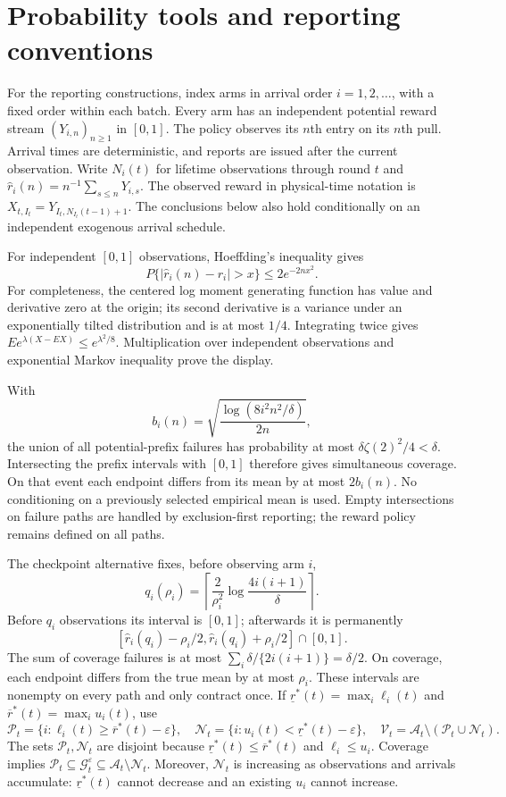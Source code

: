 \section{Probability tools and reporting conventions}
\label{app:tools}

For the reporting constructions, index arms in arrival order
$i=1,2,\ldots$, with a fixed order within each batch.
Every arm has an independent potential reward stream $(Y_{i,n})_{n\ge1}$
in $[0,1]$. The policy observes its $n$th entry on its $n$th pull. Arrival
times are deterministic, and reports are issued after the current observation.
Write $N_i(t)$ for lifetime observations through round $t$ and
$\hat r_i(n)=n^{-1}\sum_{s\le n}Y_{i,s}$. The observed reward in physical-time notation is
$X_{t,I_t}=Y_{I_t,N_{I_t}(t-1)+1}$. The conclusions below also
hold conditionally on an independent exogenous arrival schedule.

For independent $[0,1]$ observations, Hoeffding's inequality gives
\[
 P\{|\hat r_i(n)-r_i|>x\}\le2e^{-2nx^2}.
\]
For completeness, the centered log moment generating function has value and
derivative zero at the origin; its second derivative is a variance under an
exponentially tilted distribution and is at most $1/4$. Integrating twice
gives $Ee^{\lambda(X-EX)}\le e^{\lambda^2/8}$. Multiplication over independent
observations and exponential Markov inequality prove the display.

With
\[
 b_i(n)=\sqrt{\frac{\log(8i^2n^2/\delta)}{2n}},
\]
the union of all potential-prefix failures has probability at most
$\delta\zeta(2)^2/4<\delta$. Intersecting the prefix intervals with $[0,1]$
therefore gives simultaneous coverage. On that event each endpoint differs
from its mean by at most $2b_i(n)$. No conditioning on a previously selected
empirical mean is used. Empty intersections on failure paths are handled by
exclusion-first reporting; the reward policy remains defined on all paths.

The checkpoint alternative fixes, before observing arm $i$,
\[
 q_i(\rho_i)=\left\lceil\frac2{\rho_i^2}
            \log\frac{4i(i+1)}\delta\right\rceil.
\]
Before $q_i$ observations its interval is $[0,1]$; afterwards it is permanently
\[
 [\hat r_i(q_i)-\rho_i/2,
  \hat r_i(q_i)+\rho_i/2]\cap[0,1].
\]
The sum of coverage failures is at most
$\sum_i\delta/\{2i(i+1)\}=\delta/2$. On coverage, each endpoint differs from
the true mean by at most $\rho_i$. These intervals are nonempty on every path
and only contract once. If $\underline r^*(t)=\max_i\ell_i(t)$ and
$\overline r^*(t)=\max_i u_i(t)$, use
\[
 \mathcal P_t=\{i:\ell_i(t)\ge\overline r^*(t)-\varepsilon\},\quad
 \mathcal N_t=\{i:u_i(t)<\underline r^*(t)-\varepsilon\},\quad
 \mathcal V_t=\mathcal{A}_t\setminus(\mathcal P_t\cup \mathcal N_t).
\]
The sets $\mathcal P_t,\mathcal N_t$ are disjoint because
$\underline r^*(t)\le\overline r^*(t)$ and $\ell_i\le u_i$.
Coverage implies
$\mathcal P_t\subseteq \mathcal G_t^\varepsilon\subseteq \mathcal{A}_t\setminus \mathcal N_t$.
Moreover, $\mathcal N_t$ is increasing as observations and arrivals accumulate:
$\underline r^*(t)$ cannot decrease and an existing $u_i$ cannot increase.

